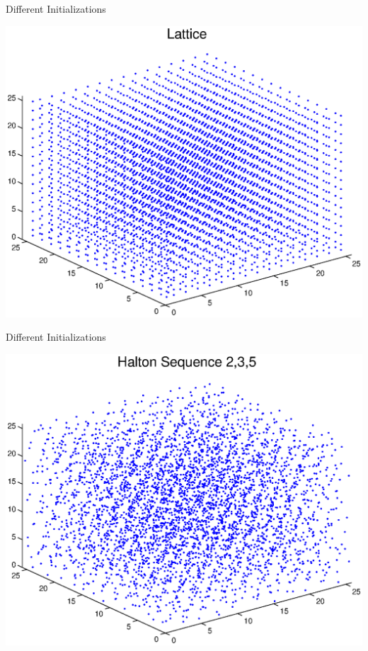 \documentclass{beamer}
\begin{document}
	\begin{frame}{Different Initializations}
	\begin{center}\includegraphics[width=\linewidth]{gridscatter.eps}\end{center}
	
	\end{frame}
	
	
	\begin{frame}{Different Initializations}
	\begin{center}\includegraphics[width=\linewidth]{haltonscatter.eps}\end{center}
	
	\end{frame}
	
\end{document}
